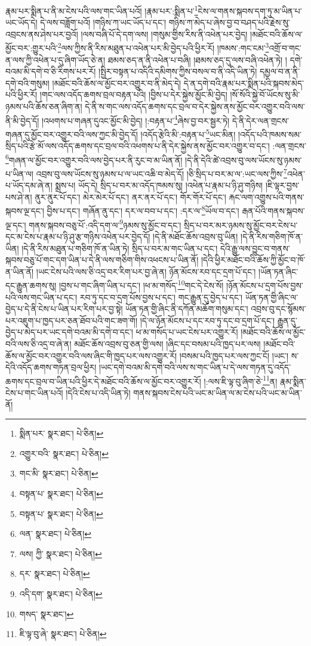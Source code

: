 རྣམ་པར་སྨིན་པ་ནི་མ་ངེས་པའི་ལས་གང་ཡིན་པའོ། །རྣམ་པར་:སྨིན་པ་\footnote{སྨིན་པར་  སྣར་ཐང་།  པེ་ཅིན། }ངེས་ལ་གནས་སྐབས་དག་ཏུ་མ་ཡིན་པ་ཡང་ཡོད་དེ། དེ་ལས་བཟློག་པའོ། །གཉིས་ཀ་ཡང་ཡོད་པ་དང་། གཉིས་ཀ་མེད་པ་ཞེས་བྱ་བ་བཤད་པའི་རྗེས་སུ་འབྲངས་ནས་ཤེས་པར་བྱའོ། །ལས་བཞི་པོ་དེ་དག་ལས། །གསུམ་གྱིས་རིས་ནི་འཕེན་པར་བྱེད། །མཐོང་བའི་ཆོས་ལ་མྱོང་བར་:གྱུར་པའི་\footnote{འགྱུར་བའི་  སྣར་ཐང་།  པེ་ཅིན། }ལས་ཀྱིས་ནི་རིས་མཐུན་པ་འཕེན་པར་མི་བྱེད་པའི་ཕྱིར་རོ། །ཁམས་:གང་ངམ་\footnote{གང་མི་  སྣར་ཐང་།  པེ་ཅིན། }འགྲོ་བ་གང་ན་ལས་ཀྱི་འཕེན་པ་དུ་ཞིག་ཡོད་ཅེ་ན། ཐམས་ཅད་ན་ནི་འཕེན་པ་བཞི། །ཐམས་ཅད་དུ་ལས་བཞི་འཕེན་ཏེ། །
དགེ་བའམ་མི་དགེ་བ་ཅི་རིགས་པར་རོ། །སྤྱིར་བསྟན་པ་འདིའི་དམིགས་ཀྱིས་བསལ་བ་ནི་འདི་ཡིན་ཏེ། དམྱལ་བ་ན་ནི་དགེ་བའི་གསུམ། །མཐོང་བའི་ཆོས་ལ་མྱོང་བར་འགྱུར་བ་ནི་མེད་དེ། དེ་ན་དགེ་བའི་རྣམ་པར་སྨིན་པའི་སྐབས་མེད་པའི་ཕྱིར་རོ། །གང་ལས་འདོད་ཆགས་བྲལ་བརྟན་པའི། །བྱིས་པ་དེར་སྐྱེས་མྱོང་མི་བྱེད། །སོ་སོའི་སྐྱེ་བོ་ཡོངས་སུ་མི་ཉམས་པའི་ཆོས་ཅན་ཞིག་ན། དེ་ནི་ས་གང་ལས་འདོད་ཆགས་དང་བྲལ་བ་དེར་སྐྱེས་ནས་མྱོང་བར་འགྱུར་བའི་ལས་ནི་མི་བྱེད་དོ། །འཕགས་པ་གཞན་དུའང་མྱོང་མི་བྱེད། །:བརྟན་པ་\footnote{བསྟན་པ་  སྣར་ཐང་།  པེ་ཅིན། }ཞེས་བྱ་བར་སྦྱར་ཏེ། དེ་ནི་དེར་ལན་གྲངས་གཞན་དུ་མྱོང་བར་འགྱུར་བའི་ལས་ཀྱང་མི་བྱེད་དོ། །འདོད་རྩེའི་མི་:བརྟན་པ་\footnote{བསྟན་པ་  སྣར་ཐང་།  པེ་ཅིན། }ཡང་མིན། །འདོད་པའི་ཁམས་སམ་སྲིད་པའི་རྩེ་མོ་ལས་འདོད་ཆགས་དང་བྲལ་བའི་འཕགས་པ་ནི་དེར་སྐྱེས་ནས་མྱོང་བར་འགྱུར་བ་དང་། :ལན་གྲངས་\footnote{ལན་  སྣར་ཐང་།  པེ་ཅིན། }གཞན་ལ་མྱོང་བར་འགྱུར་བའི་ལས་བྱེད་པར་ནི་རུང་བ་མ་ཡིན་ནོ། །དེ་ནི་དེའི་ཚེ་འབྲས་བུ་ལས་ཡོངས་སུ་ཉམས་པ་ཡིན་ལ། འབྲས་བུ་ལས་ཡོངས་སུ་ཉམས་པ་ལ་ཡང་འཆི་བ་མེད་དོ། །ཅི་སྲིད་པ་བར་མ་ལ་:ཡང་ལས་ཀྱིས་\footnote{ལས། ཀྱི་  སྣར་ཐང་།  པེ་ཅིན། }འཕེན་པ་ཡོད་དམ་ཞེ་ན། སྨྲས་པ། ཡོད་དེ། སྲིད་པ་བར་མ་འདོད་ཁམས་སུ། །འཕེན་པ་རྣམ་པ་ཉི་ཤུ་གཉིས། །ཇི་ལྟར་བྱས་པས་ཤེ་ན། ནུར་ནུར་པོ་དང་། མེར་མེར་པོ་དང་། ནར་ནར་པོ་དང་། གོར་གོར་པོ་དང་། རྐང་ལག་འགྱུས་པའི་གནས་སྐབས་ལྔ་དང་། བྱིས་པ་དང་། གཞོན་ནུ་དང་། དར་ལ་བབ་པ་དང་། :དར་ལ་\footnote{དར་  སྣར་ཐང་།  པེ་ཅིན། }ཡོལ་བ་དང་། རྒན་པོའི་གནས་སྐབས་ལྔ་དང་། གནས་སྐབས་བཅུ་པོ་:འདི་དག་ལ་\footnote{འདི་དག་  སྣར་ཐང་།  པེ་ཅིན། }ཉམས་སུ་མྱོང་བ་དང་། སྲིད་པ་བར་མར་ཉམས་སུ་མྱོང་བར་ངེས་པ་དང་མ་ངེས་པ་རྣམ་པ་ཉི་ཤུ་རྩ་གཉིས་འཕེན་པར་བྱེད་དོ། །དེ་ནི་མཐོང་ཆོས་འབྲས་བུ་ཡིན། །དེ་ནི་རིས་གཅིག་ཁོ་ན་ཡིན། །དེ་ནི་རིས་མཐུན་པ་གཅིག་ཁོ་ན་ཡིན་ཏེ། སྲིད་པ་བར་མ་གང་ཡིན་པ་དང་། དེའི་རྒྱུ་ལས་བྱུང་བ་གནས་སྐབས་བཅུ་པོ་གང་དག་ཡིན་པ་དེ་ནི་ལས་གཅིག་གིས་འཕངས་པ་ཡིན་ནོ། །དེའི་ཕྱིར་མཐོང་བའི་ཆོས་ཀྱི་མྱོང་བ་ཁོ་ན་ཡིན་ནོ། །ཡང་ངེས་པའི་ལས་ཅི་འདྲ་བར་རིག་པར་བྱ་ཞེ་ན། ཉོན་མོངས་རབ་དང་དྲག་པོ་དང་། །ཡོན་ཏན་ཞིང་དང་རྒྱུན་ཆགས་སུ། །བྱས་པ་གང་ཞིག་ཡིན་པ་དང་། །ཕ་མ་གསོད་\footnote{གསད་  སྣར་ཐང་། }གང་དེ་ངེས་སོ། །ཉོན་མོངས་པ་དྲག་པོས་བྱས་པའི་ལས་གང་ཡིན་པ་དང་། རབ་ཏུ་དང་བ་དྲག་པོས་བྱས་པ་དང་། གང་རྒྱུན་དུ་བྱེད་པ་དང་། ཡོན་ཏན་གྱི་ཞིང་ལ་བྱེད་པ་དེ་ནི་ངེས་པ་ཡིན་པར་རིག་པར་བྱ་སྟེ། ཡོན་ཏན་གྱི་ཞིང་ནི་དཀོན་མཆོག་གསུམ་དང་། འབྲས་བུ་དང་སྙོམས་པར་འཇུག་པ་ཁྱད་པར་ཅན་ཐོབ་པའི་གང་ཟག་གོ། །དེ་ལ་ཉོན་མོངས་པ་དང་རབ་ཏུ་དང་བ་དྲག་པོ་དང་། རྒྱུན་དུ་བྱེད་པ་མེད་པར་ཡང་དགེ་བའམ་མི་དགེ་བ་དང་། ཕ་མ་གསོད་པ་ཡང་ངེས་པར་འགྱུར་རོ། །མཐོང་བའི་ཆོས་ལ་མྱོང་བའི་ལས་ཅི་འདྲ་བ་ཞེ་ན། མཐོང་ཆོས་འབྲས་བུ་ཅན་གྱི་ལས། །ཞིང་དང་བསམ་པའི་ཁྱད་པར་ལས། །མཐོང་བའི་ཆོས་ལ་མྱོང་བར་འགྱུར་བའི་ལས་ཞིང་གི་ཁྱད་པར་ལས་འགྱུར་རོ། །བསམ་པའི་ཁྱད་པར་ལས་ཀྱང་ངོ། །ཡང་། ས་དེའི་འདོད་ཆགས་གཏན་བྲལ་ཕྱིར། །ཡང་དགེ་བའམ་མི་དགེ་བའི་ལས་ས་གང་ཡིན་པ་དེ་ལས་གཏན་དུ་འདོད་ཆགས་དང་བྲལ་བ་ཡིན་པའི་ཕྱིར་དེ་མཐོང་བའི་ཆོས་ལ་མྱོང་བར་འགྱུར་རོ། །:ལས་ཇི་ལྟ་བུ་ཞིག་ཅེ་\footnote{ཇི་ལྟ་བུ་ཞེ་  སྣར་ཐང་།  པེ་ཅིན། }ན། རྣམ་སྨིན་ངེས་པ་གང་ཡིན་པའོ། །དེའི་ངེས་པ་འདི་ཡིན་ཏེ། གནས་སྐབས་ངེས་པའི་ཡང་མ་ཡིན་ལ་མ་ངེས་པའི་ཡང་མ་ཡིན་ནོ། 
